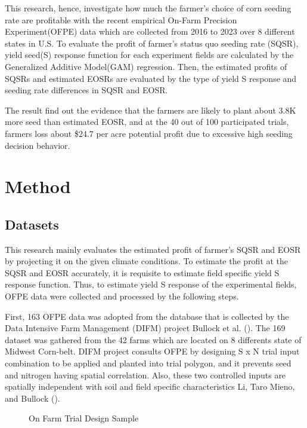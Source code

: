 \documentclass[
]{article}
\begin{document}
This research, hence, investigate how much the farmer's choice of corn
seeding rate are profitable with the recent empirical On-Farm Precision
Experiment(OFPE) data which are collected from 2016 to 2023 over 8
different states in U.S. To evaluate the profit of farmer's status quo
seeding rate (SQSR), yield seed(S) response function for each experiment
fields are calculated by the Generalized Additive Model(GAM) regression.
Then, the estimated profits of SQSRs and estimated EOSRs are evaluated
by the type of yield S response and seeding rate differences in SQSR and
EOSR.

The result find out the evidence that the farmers are likely to plant
about 3.8K more seed than estimated EOSR, and at the 40 out of 100
participated trials, farmers loss about \$24.7 per acre potential profit
due to excessive high seeding decision behavior.

\section{Method}\label{method}

\subsection{Datasets}\label{datasets}

This research mainly evaluates the estimated profit of farmer's SQSR and
EOSR by projecting it on the given climate conditions. To estimate the
profit at the SQSR and EOSR accurately, it is requisite to estimate
field specific yield S response function. Thus, to estimate yield S
response of the experimental fields, OFPE data were collected and
processed by the following steps.

First, 163 OFPE data was adopted from the database that is collected by
the Data Intensive Farm Management (DIFM) project Bullock et al.
(). The 169 dataset was gathered
from the 42 farms which are located on 8 differents state of Midwest
Corn-belt. DIFM project consults OFPE by designing S x N trial input
combination to be applied and planted into trial polygon, and it
prevents seed and nitrogen having spatial correlation. Also, these two
controlled inputs are spatially independent with soil and field specific
characteristics Li, Taro Mieno, and Bullock
().

\begin{figure}


\caption{\label{fig-td_sample}On Farm Trial Design Sample}

\end{figure}%
\end{document}

